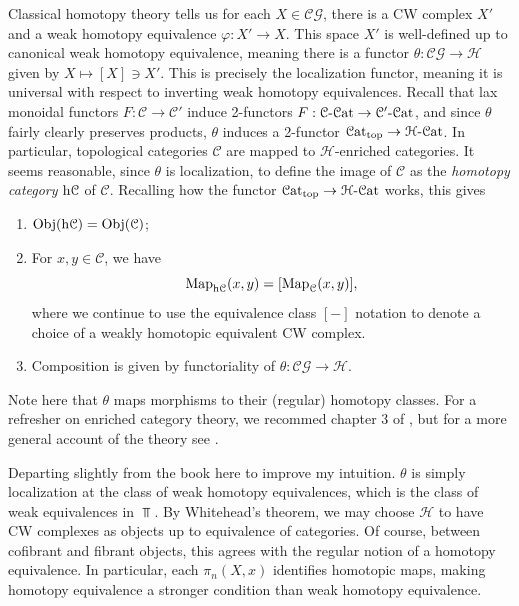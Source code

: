 Classical homotopy theory tells us for each $X\in\mathcal{C} \mathcal{G} $, there is a CW complex $X'$ and a weak homotopy equivalence $\varphi : X' \to X$. This space $X'$ is well-defined up to canonical weak homotopy equivalence, meaning there is a functor $\theta : \mathcal{C} \mathcal{G}  \to \mathcal{H} $ given by  $X\mapsto [X]\ni X'$. This is precisely the localization functor, meaning it is universal with respect to inverting weak homotopy equivalences. Recall that lax monoidal functors $F : \mathcal{C}  \to \mathcal{C} '$ induce 2-functors $F : \mathcal{C} \text{-} \mathcal{C}\mathrm{at}  \to \mathcal{C} '\text{-} \mathcal{C}\mathrm{at} $, and since $\theta$ fairly clearly preserves products, $\theta$ induces a 2-functor $\mathcal{C}\mathrm{at}_{\text{top} } \to \mathcal{H} \text{-} \mathcal{C}\mathrm{at} $. In particular, topological categories $\mathcal{C} $ are mapped to $\mathcal{H} $-enriched categories. It seems reasonable, since $\theta$ is localization, to define the image of $\mathcal{C} $ as the \emph{homotopy category} $\mathrm{h}\mathcal{C} $ of $\mathcal{C} $. Recalling how the functor $\mathcal{C}\mathrm{at} _{\text{top} } \to \mathcal{H} \text{-} \mathcal{C}\mathrm{at} $ works, this gives
\begin{enumerate}
	\item $\operatorname{Obj}(\mathrm{h}\mathcal{C} ) =\operatorname{Obj}(\mathcal{C} ) $;
	\item For $x,y\in \mathcal{C} $, we have
		\[
			\operatorname{Map} _{\mathrm{h}\mathcal{C} } (x,y) =[\operatorname{Map}_\mathcal{C} (x,y)]
		,\]
		where we continue to use the equivalence class $[-]$ notation to denote a choice of a weakly homotopic equivalent CW complex.
	\item Composition is given by functoriality of $\theta : \mathcal{C} \mathcal{G}  \to \mathcal{H} $.
\end{enumerate}
Note here that $\theta$ maps morphisms to their (regular) homotopy classes. For a refresher on enriched category theory, we recommed chapter 3 of \cite{cathtpy}, but for a more general account of the theory see \cite{kelly05}.

\begin{intuition}\label{1.1.3.5}
	Departing slightly from the book here to improve my intuition. $\theta$ is simply localization at the class of weak homotopy equivalences, which is the class of weak equivalences in $\Top $. By Whitehead's theorem, we may choose $\mathcal{H} $ to have CW complexes as objects up to equivalence of categories. Of course, between cofibrant and fibrant objects, this agrees with the regular notion of a homotopy equivalence. In particular, each $\pi_n(X,x)$ identifies homotopic maps, making homotopy equivalence a stronger condition than weak homotopy equivalence.
\end{intuition}

